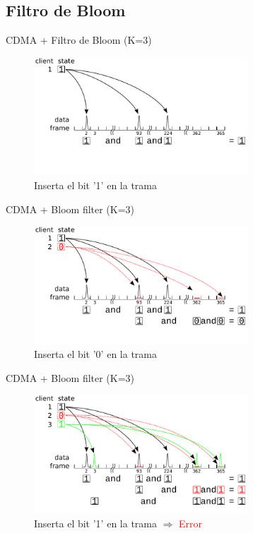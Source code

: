 \documentclass[aspectratio=169]{beamer}
\begin{document}
\subsection{Filtro de Bloom}
\begin{frame}{CDMA + Filtro de Bloom (K=3)}
\begin{figure}[t]
  \centering
    \includegraphics[width=8cm]{graphs/z_bloom1.pdf}
    \\ \huge Inserta el bit '1' en la trama
\end{figure}
\end{frame}
\begin{frame}{CDMA + Bloom filter (K=3)}
\begin{figure}[t]
  \centering
    \includegraphics[width=8cm]{graphs/z_bloom2.pdf}
    \\ \huge Inserta el bit '0' en la trama
\end{figure}
\end{frame}
\begin{frame}{CDMA + Bloom filter (K=3)}
\begin{figure}[t]
  \centering
    \includegraphics[width=8cm]{graphs/z_bloom3.pdf}
    \\ \huge Inserta el bit '1' en la trama $\Rightarrow$ \textcolor{red}{Error}
\end{figure}
\end{frame}
\end{document}

